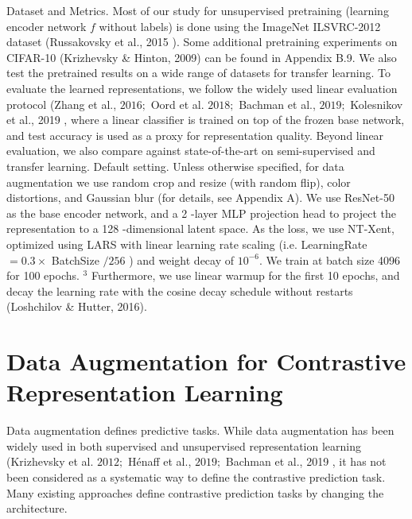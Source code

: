 \documentclass[]{IEEEtran}
\begin{document}
Dataset and Metrics. Most of our study for unsupervised pretraining (learning encoder network $f$ without labels) is done using the ImageNet ILSVRC-2012 dataset (Russakovsky et al., 2015 ). Some additional pretraining experiments on CIFAR-10 (Krizhevsky \& Hinton, 2009) can be found in Appendix B.9. We also test the pretrained results on a wide range of datasets for transfer learning. To evaluate the learned representations, we follow the widely used linear evaluation protocol (Zhang et al., $2016 ;$ Oord et al. $2018 ;$ Bachman et al., $2019 ;$ Kolesnikov et al., 2019 , where
a linear classifier is trained on top of the frozen base network, and test accuracy is used as a proxy for representation quality. Beyond linear evaluation, we also compare against state-of-the-art on semi-supervised and transfer learning.
Default setting. Unless otherwise specified, for data augmentation we use random crop and resize (with random flip), color distortions, and Gaussian blur (for details, see Appendix A). We use ResNet-50 as the base encoder network, and a 2 -layer MLP projection head to project the representation to a 128 -dimensional latent space. As the loss, we use NT-Xent, optimized using LARS with linear learning rate scaling (i.e. LearningRate $=0.3 \times$ BatchSize $/ 256$ ) and weight decay of $10^{-6}$. We train at batch size 4096 for 100 epochs. $^{3}$ Furthermore, we use linear warmup for the first 10 epochs, and decay the learning rate with the cosine decay schedule without restarts (Loshchilov \& Hutter, 2016).

\section{Data Augmentation for Contrastive Representation Learning }

Data augmentation defines predictive tasks. While data augmentation has been widely used in both supervised and unsupervised representation learning (Krizhevsky et al. $2012 ;$ Hénaff et al., $2019 ;$ Bachman et al., 2019 , it has not been considered as a systematic way to define the contrastive prediction task. Many existing approaches define contrastive prediction tasks by changing the architecture.
\end{document}
